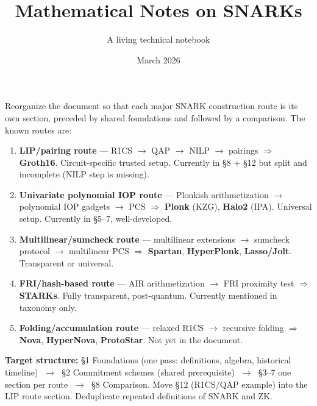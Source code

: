 \documentclass[11pt]{article}
\title{\textbf{Mathematical Notes on SNARKs}}
\author{A living technical notebook}
\date{March 2026}
\begin{document}
\maketitle
\thispagestyle{empty}

\begin{tcolorbox}[colback=yellow!15!white, colframe=orange!80!black,
  boxrule=0.8pt, arc=2mm, title=\textbf{TODO: Restructure around construction routes}]
\small

Reorganize the document so that each major SNARK construction route is its own section, preceded by shared foundations and followed by a comparison. The known routes are:

\begin{enumerate}
  \item \textbf{LIP/pairing route} --- R1CS $\to$ QAP $\to$ NILP $\to$ pairings $\Rightarrow$ \textbf{Groth16}. Circuit-specific trusted setup. Currently in §8 + §12 but split and incomplete (NILP step is missing).
  \item \textbf{Univariate polynomial IOP route} --- Plonkish arithmetization $\to$ polynomial IOP gadgets $\to$ PCS $\Rightarrow$ \textbf{Plonk} (KZG), \textbf{Halo2} (IPA). Universal setup. Currently in §5--7, well-developed.
  \item \textbf{Multilinear/sumcheck route} --- multilinear extensions $\to$ sumcheck protocol $\to$ multilinear PCS $\Rightarrow$ \textbf{Spartan}, \textbf{HyperPlonk}, \textbf{Lasso/Jolt}. Transparent or universal.
  \item \textbf{FRI/hash-based route} --- AIR arithmetization $\to$ FRI proximity test $\Rightarrow$ \textbf{STARKs}. Fully transparent, post-quantum. Currently mentioned in taxonomy only.
  \item \textbf{Folding/accumulation route} --- relaxed R1CS $\to$ recursive folding $\Rightarrow$ \textbf{Nova}, \textbf{HyperNova}, \textbf{ProtoStar}. Not yet in the document.
\end{enumerate}

\medskip
\textbf{Target structure:} §1 Foundations (one pass: definitions, algebra, historical timeline) $\;\to\;$ §2 Commitment schemes (shared prerequisite) $\;\to\;$ §3--7 one section per route $\;\to\;$ §8 Comparison. Move §12 (R1CS/QAP example) into the LIP route section. Deduplicate repeated definitions of SNARK and ZK.
\end{tcolorbox}
\end{document}
